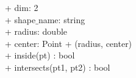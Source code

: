 {
+ dim: 2 \\
+ shape$\_$name: string \\
+ radius: double \\
+ center: Point 
}
{
+ \dunder(radius, center) \\
+ inside(pt) : bool\\
+ intersects(pt1, pt2) : bool
}

